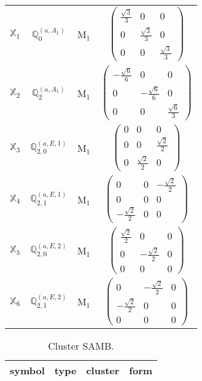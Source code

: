 \documentclass[fleqn,10pt,landscape]{article}
\begin{document}
\begin{itemize}
\begin{center}
\begin{longtable}{c|c|c|c}
$ \mathbb{X}_{1} $ & $\mathbb{Q}_{0}^{(a,A_{1})}$ & M$_{1}$ & $\begin{pmatrix} \frac{\sqrt{3}}{3} & 0 & 0 \\ 0 & \frac{\sqrt{3}}{3} & 0 \\ 0 & 0 & \frac{\sqrt{3}}{3} \end{pmatrix}$ \\
$ \mathbb{X}_{2} $ & $\mathbb{Q}_{2}^{(a,A_{1})}$ & M$_{1}$ & $\begin{pmatrix} - \frac{\sqrt{6}}{6} & 0 & 0 \\ 0 & - \frac{\sqrt{6}}{6} & 0 \\ 0 & 0 & \frac{\sqrt{6}}{3} \end{pmatrix}$ \\
$ \mathbb{X}_{3} $ & $\mathbb{Q}_{2,0}^{(a,E,1)}$ & M$_{1}$ & $\begin{pmatrix} 0 & 0 & 0 \\ 0 & 0 & \frac{\sqrt{2}}{2} \\ 0 & \frac{\sqrt{2}}{2} & 0 \end{pmatrix}$ \\
$ \mathbb{X}_{4} $ & $\mathbb{Q}_{2,1}^{(a,E,1)}$ & M$_{1}$ & $\begin{pmatrix} 0 & 0 & - \frac{\sqrt{2}}{2} \\ 0 & 0 & 0 \\ - \frac{\sqrt{2}}{2} & 0 & 0 \end{pmatrix}$ \\
$ \mathbb{X}_{5} $ & $\mathbb{Q}_{2,0}^{(a,E,2)}$ & M$_{1}$ & $\begin{pmatrix} \frac{\sqrt{2}}{2} & 0 & 0 \\ 0 & - \frac{\sqrt{2}}{2} & 0 \\ 0 & 0 & 0 \end{pmatrix}$ \\
$ \mathbb{X}_{6} $ & $\mathbb{Q}_{2,1}^{(a,E,2)}$ & M$_{1}$ & $\begin{pmatrix} 0 & - \frac{\sqrt{2}}{2} & 0 \\ - \frac{\sqrt{2}}{2} & 0 & 0 \\ 0 & 0 & 0 \end{pmatrix}$ \\
\end{longtable}
\end{center}
\begin{center}
\renewcommand{\arraystretch}{1.3}
\begin{longtable}{c|c|c|c}
\caption{Cluster SAMB.}
 \\
 \hline \hline
symbol & type & cluster & form \\ \hline \endfirsthead


\end{longtable}
\end{center}
\end{itemize}
\end{document}
